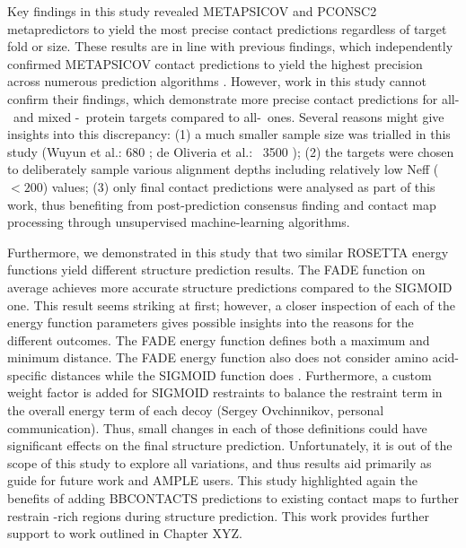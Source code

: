 Key findings in this study revealed METAPSICOV and PCONSC2 metapredictors to yield the most precise contact predictions regardless of target fold or size. These results are in line with previous findings, which independently confirmed METAPSICOV contact predictions to yield the highest precision across numerous prediction algorithms \cite{Wuyun2016-tx, De_Oliveira2017-yf}. However, work in this study cannot confirm their findings, which demonstrate more precise contact predictions for all-\textbeta\ and mixed \textalpha-\textbeta\ protein targets compared to all-\textalpha\ ones. Several reasons might give insights into this discrepancy: (1) a much smaller sample size was trialled in this study (Wuyun et al.: 680 \cite{Wuyun2016-tx}; de Oliveria et al.: ~3500 \cite{De_Oliveira2017-yf}); (2) the targets were chosen to deliberately sample various alignment depths including relatively low Neff ($<200$) values; (3) only final contact predictions were analysed as part of this work, thus benefiting from post-prediction consensus finding and contact map processing through unsupervised machine-learning algorithms.

Furthermore, we demonstrated in this study that two similar ROSETTA energy functions yield different structure prediction results. The FADE function on average achieves more accurate structure predictions compared to the SIGMOID one. This result seems striking at first; however, a closer inspection of each of the energy function parameters gives possible insights into the reasons for the different outcomes. The FADE energy function defines both a maximum and minimum distance. The FADE energy function also does not consider amino acid-specific distances while the SIGMOID function does \cite{Kamisetty2013-bs}. Furthermore, a custom weight factor is added for SIGMOID restraints to balance the restraint term in the overall energy term of each decoy (Sergey Ovchinnikov, personal communication). Thus, small changes in each of those definitions could have significant effects on the final structure prediction. Unfortunately, it is out of the scope of this study to explore all variations, and thus results aid primarily as guide for future work and AMPLE users. This study highlighted again the benefits of adding BBCONTACTS predictions to existing contact maps to further restrain \textbeta-rich regions during structure prediction. This work provides further support to work outlined in Chapter XYZ.

